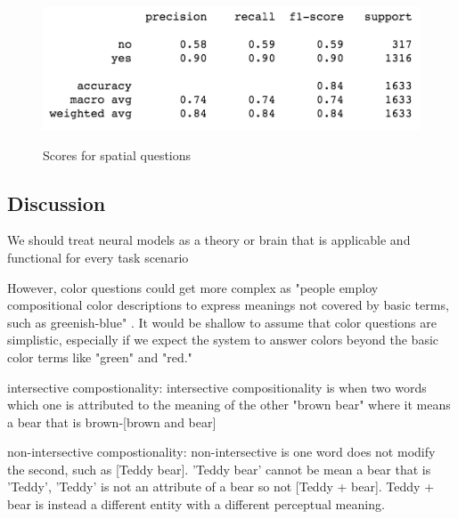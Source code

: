 \begin{figure}[H]
\includegraphics[scale=0.45]{latex/images/spatialscore.png}
\label{fig:HeatmapAfter}
\caption{Scores for spatial questions}
\end{figure}



\subsection{Discussion}

We should treat neural models as a theory or brain that is applicable and functional for every task scenario \cite{regier1996human}  

\cite{dobnik2009teaching}

However, color questions could get more complex as "people employ compositional color descriptions to express meanings not covered by basic terms, such as greenish-blue" \cite{monroe2016learning}. It would be shallow to assume that color questions are simplistic, especially if we expect the system to answer colors beyond the basic color terms like "green" and "red." 

\cite{monroe2017colors}


intersective compostionality: intersective compositionality is when two words which one is attributed to the meaning of the other "brown bear" where it means a bear that is brown-[brown and bear] 

non-intersective compostionality: non-intersective is one word does not modify the second, such as [Teddy bear]. 'Teddy bear' cannot be mean a bear that is 'Teddy', 'Teddy' is not an attribute of a bear so not [Teddy + bear]. Teddy + bear is instead a different entity with a different perceptual meaning. 

\cite{larsson-2017-compositionality} 